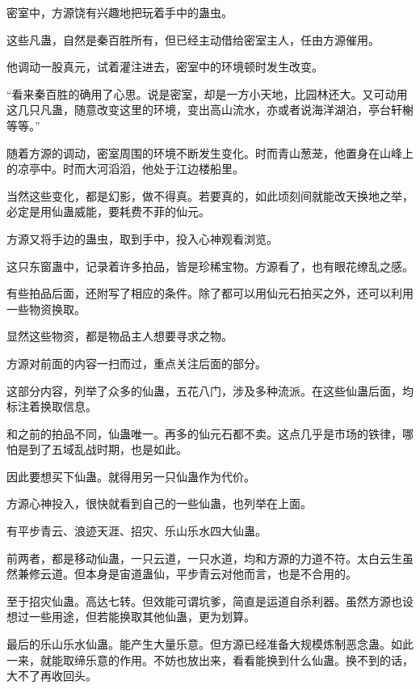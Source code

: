
\begin{this_body}

密室中，方源饶有兴趣地把玩着手中的蛊虫。

这些凡蛊，自然是秦百胜所有，但已经主动借给密室主人，任由方源催用。

他调动一股真元，试着灌注进去，密室中的环境顿时发生改变。

“看来秦百胜的确用了心思。说是密室，却是一方小天地，比园林还大。又可动用这几只凡蛊，随意改变这里的环境，变出高山流水，亦或者说海洋湖泊，亭台轩榭等等。”

随着方源的调动，密室周围的环境不断发生变化。时而青山葱茏，他置身在山峰上的凉亭中。时而大河滔滔，他处于江边楼船里。

当然这些变化，都是幻影，做不得真。若要真的，如此顷刻间就能改天换地之举，必定是用仙蛊威能，要耗费不菲的仙元。

方源又将手边的蛊虫，取到手中，投入心神观看浏览。

这只东窗蛊中，记录着许多拍品，皆是珍稀宝物。方源看了，也有眼花缭乱之感。

有些拍品后面，还附写了相应的条件。除了都可以用仙元石拍买之外，还可以利用一些物资换取。

显然这些物资，都是物品主人想要寻求之物。

方源对前面的内容一扫而过，重点关注后面的部分。

这部分内容，列举了众多的仙蛊，五花八门，涉及多种流派。在这些仙蛊后面，均标注着换取信息。

和之前的拍品不同，仙蛊唯一。再多的仙元石都不卖。这点几乎是市场的铁律，哪怕是到了五域乱战时期，也是如此。

因此要想买下仙蛊。就得用另一只仙蛊作为代价。

方源心神投入，很快就看到自己的一些仙蛊，也列举在上面。

有平步青云、浪迹天涯、招灾、乐山乐水四大仙蛊。

前两者，都是移动仙蛊，一只云道，一只水道，均和方源的力道不符。太白云生虽然兼修云道。但本身是宙道蛊仙，平步青云对他而言，也是不合用的。

至于招灾仙蛊。高达七转。但效能可谓坑爹，简直是运道自杀利器。虽然方源也设想过一些用途，但若能换取其他仙蛊，更为划算。

最后的乐山乐水仙蛊。能产生大量乐意。但方源已经准备大规模炼制恶念蛊。如此一来，就能取缔乐意的作用。不妨也放出来，看看能换到什么仙蛊。换不到的话，大不了再收回头。


\end{this_body}
